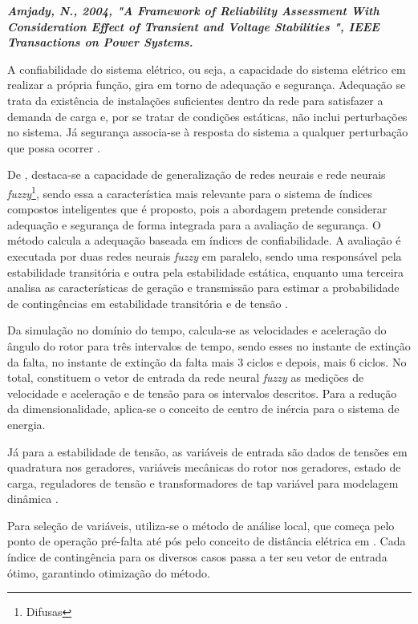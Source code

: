 \documentclass[12pt,oneside,a4paper,chapter=TITLE,section=TITLE,sumario=tradicional,english,brazil]{abntex2}
\begin{document}
\textbf{\textit{Amjady, N., 2004, "A Framework of Reliability Assessment With Consideration Effect of Transient and Voltage Stabilities ",  IEEE Transactions on Power Systems.}}\par
A confiabilidade do sistema elétrico, ou seja, a capacidade do sistema elétrico em realizar a própria função, gira em torno de adequação e segurança. Adequação se trata da existência de instalações suficientes dentro da rede para satisfazer a demanda de carga e, por se tratar de condições estáticas, não inclui perturbações no sistema. Já segurança associa-se à resposta do sistema a qualquer perturbação que possa ocorrer \cite{billinton1996}.\par 
	De \cite{amjady1999}, destaca-se a capacidade de generalização de redes neurais e rede neurais \textit{fuzzy}\footnote{Difusas}, sendo essa a característica mais relevante para o sistema de índices compostos inteligentes que é proposto, pois a abordagem pretende considerar adequação e segurança de forma integrada para a avaliação de segurança. O método calcula a adequação baseada em índices de confiabilidade. A avaliação é executada por duas redes neurais \textit{fuzzy} em paralelo, sendo uma responsável pela estabilidade transitória e outra pela estabilidade estática, enquanto uma terceira analisa as características de geração e transmissão para estimar a probabilidade de contingências em estabilidade transitória e de tensão \cite{amjady1999}.\par 
	Da simulação no domínio do tempo, calcula-se as velocidades e aceleração do ângulo do rotor para três intervalos de tempo, sendo esses no instante de extinção da falta, no instante de extinção da falta mais 3 ciclos e depois, mais 6 ciclos. No total, constituem o vetor de entrada da rede neural \textit{fuzzy} as medições de velocidade e aceleração e de tensão para os intervalos descritos. Para a redução da dimensionalidade, aplica-se o conceito de centro de inércia para o sistema de energia.\par 
	Já para a estabilidade de tensão, as variáveis de entrada são dados de tensões em quadratura nos geradores, variáveis mecânicas do rotor nos geradores, estado de carga, reguladores de tensão e transformadores de tap variável para modelagem dinâmica \cite{chowdhury2001}.\par 
	Para seleção de variáveis, utiliza-se o método de análise local, que começa pelo ponto de operação pré-falta até pós pelo conceito de distância elétrica em \cite{amjady2007}. Cada índice de contingência para os diversos casos passa a ter seu vetor de entrada ótimo, garantindo otimização do método. \par 
\end{document}
